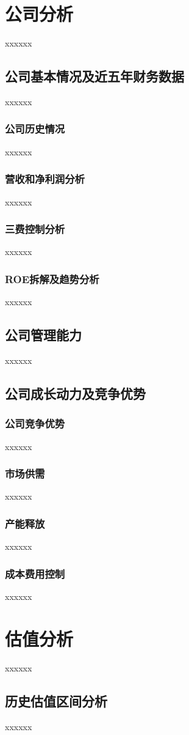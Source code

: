 \documentclass[a4paper,12pt,lang=cn,fontset = windows]{elegantpaper} %
\begin{document}
\section{公司分析}
xxxxxx
\subsection{公司基本情况及近五年财务数据} 
xxxxxx
\subsubsection{公司历史情况}
xxxxxx
\subsubsection{营收和净利润分析}
xxxxxx
\subsubsection{三费控制分析}
xxxxxx
\subsubsection{ROE拆解及趋势分析}
xxxxxx
\subsection{公司管理能力}
xxxxxx
\subsection{公司成长动力及竞争优势}
\subsubsection{公司竞争优势}
xxxxxx  
\subsubsection{市场供需}
xxxxxx
\subsubsection{产能释放}
xxxxxx
\subsubsection{成本费用控制}
xxxxxx
\section{估值分析}
xxxxxx
\subsection{历史估值区间分析}
xxxxxx
\end{document}
